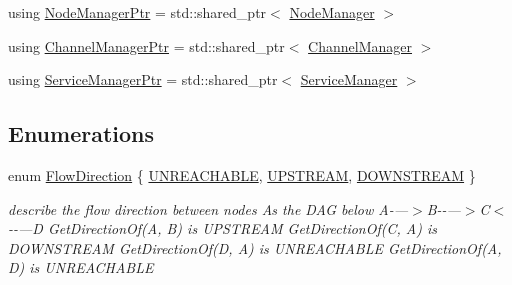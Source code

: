 \begin{DoxyCompactItemize}
\item 
using \hyperlink{namespaceapollo_1_1cyber_1_1service__discovery_a1e5adf7bd56b68299dae8d202f20bc81}{Node\-Manager\-Ptr} = std\-::shared\-\_\-ptr$<$ \hyperlink{classapollo_1_1cyber_1_1service__discovery_1_1NodeManager}{Node\-Manager} $>$
\item 
using \hyperlink{namespaceapollo_1_1cyber_1_1service__discovery_a12c2dfc39551ef96e3110dae235ab609}{Channel\-Manager\-Ptr} = std\-::shared\-\_\-ptr$<$ \hyperlink{classapollo_1_1cyber_1_1service__discovery_1_1ChannelManager}{Channel\-Manager} $>$
\item 
using \hyperlink{namespaceapollo_1_1cyber_1_1service__discovery_a257bddadfae4c3b6efbc25c6d63c28f9}{Service\-Manager\-Ptr} = std\-::shared\-\_\-ptr$<$ \hyperlink{classapollo_1_1cyber_1_1service__discovery_1_1ServiceManager}{Service\-Manager} $>$
\end{DoxyCompactItemize}
\subsection*{Enumerations}
\begin{DoxyCompactItemize}
\item 
enum \hyperlink{namespaceapollo_1_1cyber_1_1service__discovery_a463f9fa98e31287620adc568e1299c79}{Flow\-Direction} \{ \hyperlink{namespaceapollo_1_1cyber_1_1service__discovery_a463f9fa98e31287620adc568e1299c79a6fc110ded3787fc4167d94abfd3b1fcd}{U\-N\-R\-E\-A\-C\-H\-A\-B\-L\-E}, 
\hyperlink{namespaceapollo_1_1cyber_1_1service__discovery_a463f9fa98e31287620adc568e1299c79ad6c10069de9e16662456d5c56507ee0c}{U\-P\-S\-T\-R\-E\-A\-M}, 
\hyperlink{namespaceapollo_1_1cyber_1_1service__discovery_a463f9fa98e31287620adc568e1299c79ac20fc42eb935133731caf620e070cffe}{D\-O\-W\-N\-S\-T\-R\-E\-A\-M}
 \}
\begin{DoxyCompactList}\small\item\em describe the flow direction between nodes As the D\-A\-G below A-\/---$>$B-\/-\/---$>$C$<$-\/-\/---D Get\-Direction\-Of(\-A, B) is U\-P\-S\-T\-R\-E\-A\-M Get\-Direction\-Of(\-C, A) is D\-O\-W\-N\-S\-T\-R\-E\-A\-M Get\-Direction\-Of(\-D, A) is U\-N\-R\-E\-A\-C\-H\-A\-B\-L\-E Get\-Direction\-Of(\-A, D) is U\-N\-R\-E\-A\-C\-H\-A\-B\-L\-E \end{DoxyCompactList}\end{DoxyCompactItemize}


